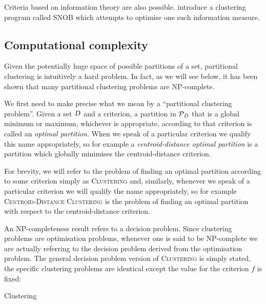 Criteria based on information theory are also possible.
\citet{wallace1968information} introduce a clustering program called SNOB
which attempts to optimise one such information measure.

\subsection{Computational complexity}
\label{sec:complexity-issues}

Given the potentially huge space of possible partitions of a set, partitional
clustering is intuitively a hard problem.  In fact, as we will see below, it
has been shown that many partitional clustering problems are NP-complete.

We first need to make precise what we mean by a ``partitional clustering
problem''.  Given a set $D$ and a criterion, a partition in
$\mathcal{P}_{D}$ that is a global minimum or maximum, whichever is
appropriate, according to that criterion is called an \textit{optimal
  partition}.  When we speak of a particular criterion we qualify this name
appropriately, so for example a \textit{centroid-distance optimal partition}
is a partition which globally minimises the centroid-distance criterion.

For brevity, we will refer to the problem of finding an optimal partition
according to some criterion simply as \textsc{Clustering} and, similarly,
whenever we speak of a particular criterion we will qualify the name
appropriately, so for example \textsc{Centroid-Distance Clustering} is the
problem of finding an optimal partition with respect to the centroid-distance
criterion.

An NP-completeness result refers to a decision problem.  Since clustering
problems are optimisation problems, whenever one is said to be NP-complete we
are actually referring to the decision problem derived from the optimisation
problem.  The general decision problem version of \textsc{Clustering} is
simply stated, the specific clustering problems are identical except the value
for the criterion $f$ is fixed:
\begin{problem}{Clustering}
\end{problem}

